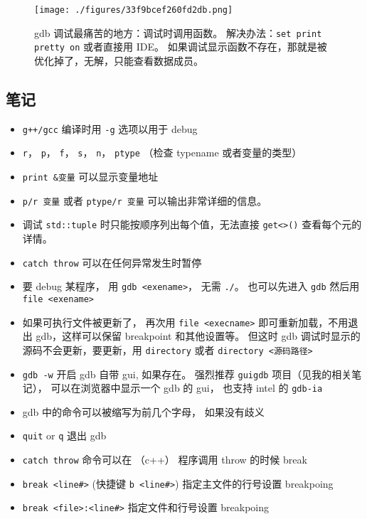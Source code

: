 

\begin{figure}[ht]
\centering
\texttt{[image: ./figures/33f9bcef260fd2db.png]}
\caption{gdb 调试最痛苦的地方：调试时调用函数。 解决办法：\verb`set print pretty on` 或者直接用 IDE。 如果调试显示函数不存在，那就是被优化掉了，无解，只能查看数据成员。} \label{fig_gdbNt_1}
\end{figure}

\subsection{笔记}
\begin{itemize}
\item \verb|g++/gcc| 编译时用 \verb`-g` 选项以用于 debug
\item \verb|r|， \verb|p|， \verb|f|， \verb|s|， \verb|n|， \verb|ptype| （检查 typename 或者变量的类型）
\item \verb`print &变量` 可以显示变量地址
\item \verb`p/r 变量` 或者 \verb`ptype/r 变量` 可以输出非常详细的信息。
\item 调试 \verb`std::tuple` 时只能按顺序列出每个值，无法直接 \verb`get<>()` 查看每个元的详情。
\item \verb|catch throw| 可以在任何异常发生时暂停
\item 要 debug 某程序， 用 \verb`gdb <exename>`， 无需 \verb`./`。 也可以先进入 \verb`gdb` 然后用 \verb`file <exename>`
\item 如果可执行文件被更新了， 再次用 \verb`file <execname>` 即可重新加载，不用退出 gdb，这样可以保留 breakpoint 和其他设置等。 但这时 gdb 调试时显示的源码不会更新，要更新，用 \verb`directory` 或者 \verb`directory <源码路径>`
\item \verb`gdb -w` 开启 gdb 自带 gui, 如果存在。 强烈推荐 \verb`guigdb` 项目（见我的相关笔记）， 可以在浏览器中显示一个 gdb 的 gui， 也支持 intel 的 \verb`gdb-ia`
\item gdb 中的命令可以被缩写为前几个字母， 如果没有歧义
\item \verb`quit` or \verb`q` 退出 gdb
\item \verb`catch throw` 命令可以在 （c++） 程序调用 throw 的时候 break
\item \verb`break <line#>`  (快捷键 \verb`b <line#>`) 指定主文件的行号设置 breakpoing
\item \verb`break <file>:<line#>` 指定文件和行号设置 breakpoing

\end{itemize}
